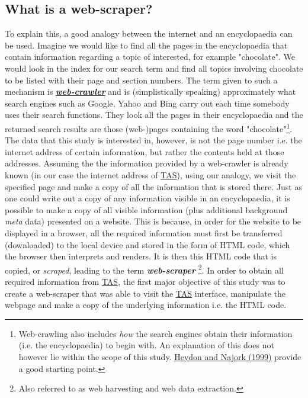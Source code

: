 \documentclass{article}
\begin{document}
\subsection{What is a web-scraper?}
\label{sec-3-1}
To explain this, a good analogy between the internet and an encyclopaedia can be used. Imagine we would like to find all the pages in the encyclopaedia that contain information regarding a topic of interested, for example "chocolate". We would look in the index for our search term and find all topics involving chocolate to be listed with their page and section numbers. The term given to such a mechanism is \textbf{\href{https://en.wikipedia.org/wiki/Web_crawler}{\emph{web-crawler}}} and is (simplistically speaking) approximately what search engines such as Google, Yahoo and Bing carry out each time somebody uses their search functions. They look all the pages in their encyclopaedia and the returned search results are those (web-)pages containing the word "chocolate"\footnote{Web-crawling also includes \emph{how} the search engines obtain their information (i.e. the encyclopaedia) to begin with. An explanation of this does not however lie within the scope of this study. \href{http://link.springer.com/article/10.1023/A:1019213109274}{Heydon and Najork (1999)} provide a good starting point.}. The data that this study is interested in, however, is not the page number i.e. the internet address of certain information, but rather the contents held at those addresses.
\noindent
Assuming the the information provided by a web-crawler is already known (in our case the internet address of \hyperref[TAS]{TAS}), using our analogy, we visit the specified page and make a copy of all the information that is stored there. Just as one could write out a copy of any information visible in an encyclopaedia, it is possible to make a copy of all visible information (plus additional background \emph{meta} data) presented on a website. This is because, in order for the website to be displayed in a browser, all the required information must first be transferred (downloaded) to the local device and stored in the form of HTML code, which the browser then interprets and renders. It is then this HTML code that is copied, or \emph{scraped}, leading to the term \textbf{\emph{web-scraper}} \footnote{Also referred to as web harvesting and web data extraction.}.
\noindent
In order to obtain all required information from \hyperref[TAS]{TAS}, the first major objective of this study was to create a web-scraper that was able to visit the \hyperref[TAS]{TAS} interface, manipulate the webpage and make a copy of the underlying information i.e. the HTML code.
\noindent
\end{document}
